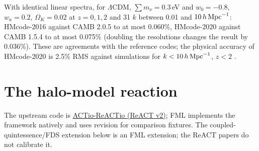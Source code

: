 \begin{validation}
With identical linear spectra, for $\Lambda$CDM, $\sum m_\nu=0.3$\,eV and $w_0=-0.8$, $w_a=0.2$, $\Omega_K=0.02$ at
$z=0,1,2$ and 31 $k$ between 0.01 and $10\,h\,\mathrm{Mpc}^{-1}$: HMcode-2016 against CAMB 2.0.5  to at most 0.060\%,
HMcode-2020 against CAMB 1.5.4  to at most 0.075\% (doubling the resolutions changes the result by
0.036\%). These are agreements with the reference codes; the physical accuracy of HMcode-2020 is 2.5\% RMS against
simulations for $k<10\,h\,\mathrm{Mpc}^{-1}$, $z<2$ \cite{Mead2021}.
\end{validation}

\section{The halo-model reaction}\label{sec:hm-react}

The upstream code is \href{https://github.com/nebblu/ACTio-ReACTio}{ACTio-ReACTio (ReACT v2)};
FML implements the framework natively and uses revision  for comparison fixtures.
The coupled-quintessence/FDS extension below is an FML extension; the ReACT papers do not calibrate it.

